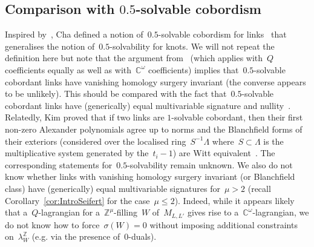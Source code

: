 \documentclass[10.9pt,a4paper]{amsart}
\theoremstyle{definition}
\theoremstyle{remark}
\newcommand{\Z}{\mathbb{Z}}
\newcommand{\C}{\mathbb{C}}
\begin{document}
\subsection{Comparison with $0.5$-solvable cobordism }

Inspired by~\cite{CochranOrrTeichner}, Cha defined a notion of~$0.5$-solvable cobordism for links~\cite[Definition 2.8]{ChaSymmetric} that generalises the notion of~$0.5$-solvability for knots.
We will not repeat the definition  here but note that the argument from~\cite[Proposition 5.10]{ConwayNagelToffoli} (which applies with~$Q$ coefficients equally as well as with~$\C^\omega$ coefficients) implies that~$0.5$-solvable cobordant links have vanishing homology surgery invariant (the converse appears to be unlikely).
This should be compared with the fact that~$0.5$-solvable cobordant links have (generically) equal multivariable signature and nullity~\cite[Theorem 1.5]{ConwayNagelToffoli}.
Relatedly, Kim proved that if two links are
$1$-solvable cobordant,  then their first non-zero Alexander polynomials agree up to norms and the Blanchfield forms of their exteriors (considered over the localised ring~$S^{-1}\Lambda$ where~$S \subset \Lambda$ is the multiplicative system generated by the~$t_i-1$) are Witt equivalent~\cite{KimWhitney}.
The corresponding statements for~$0.5$-solvability remain unknown.
We also do not know whether links with vanishing homology surgery invariant (or Blanchfield class) have (generically) equal multivariable signatures for~$\mu>2$ (recall Corollary~\ref{cor:IntroSeifert} for the case~$\mu\le 2$).
Indeed,  while it appears likely that a~$Q$-lagrangian for a~$\Z^\mu$-filling~$W$ of~$M_{L,L'}$ gives rise to a~$\C^\omega$-lagrangian,  we do not know how to force~$\sigma(W)=0$ without imposing additional constraints on~$\lambda_W^\Z$ (e.g. via the presence of~$0$-duals).
\end{document}
